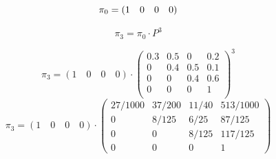 \documentclass{templateNote}
\begin{document}
\begin{enumerate}
\begin{enumerate}[label=\alph*)]
        
        \begin{equation*}
            \pi_0 = (1 \quad 0 \quad 0 \quad 0)\\
        \end{equation*}

        \begin{equation*}
            \pi_3 = \pi_0 \cdot P^3
        \end{equation*}

        \begin{equation*}
            \pi_3 = (1 \quad 0 \quad 0 \quad 0)
            \cdot
            \begin{pmatrix}
                0.3 & 0.5 & 0 & 0.2 \\
                0 & 0.4 & 0.5 & 0.1 \\
                0 & 0 & 0.4 & 0.6 \\
                0 & 0 & 0 & 1 \\
            \end{pmatrix}^3
        \end{equation*}
        \begin{equation*}
            \pi_3 = (1 \quad 0 \quad 0 \quad 0)
            \cdot
            \begin{pmatrix}
                27/1000	& 37/200 & 11/40 & 513/1000\\
                0 & 8/125 & 6/25 & 87/125 \\
                0 & 0 & 8/125 & 117/125 \\
                0 & 0 & 0 & 1
            \end{pmatrix}
        \end{equation*}


\end{enumerate}
\end{enumerate}
\end{document}
